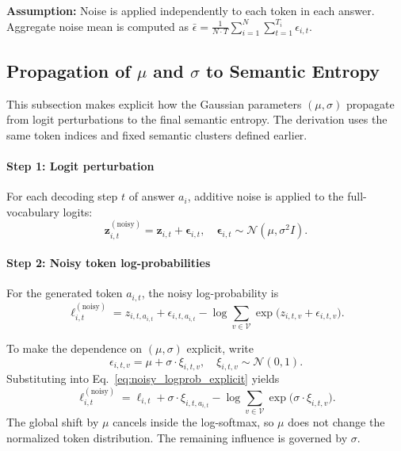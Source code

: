 \documentclass{article}
\begin{document}
\textbf{Assumption:} Noise is applied independently to each token in each answer. Aggregate noise mean is computed as $\bar{\epsilon} = \frac{1}{N \cdot T} \sum_{i=1}^{N} \sum_{t=1}^{T_i} \epsilon_{i,t}$.

\subsection{Propagation of $\mu$ and $\sigma$ to Semantic Entropy}

This subsection makes explicit how the Gaussian parameters $(\mu, \sigma)$ propagate from logit perturbations to the final semantic entropy. The derivation uses the same token indices and fixed semantic clusters defined earlier.

\paragraph{Step 1: Logit perturbation}
For each decoding step $t$ of answer $a_i$, additive noise is applied to the full-vocabulary logits:
\begin{equation}
\boldsymbol{z}_{i,t}^{(\text{noisy})} = \boldsymbol{z}_{i,t} + \boldsymbol{\epsilon}_{i,t},
\quad \boldsymbol{\epsilon}_{i,t} \sim \mathcal{N}(\mu, \sigma^2 I).
\label{eq:noisy_logits}
\end{equation}

\paragraph{Step 2: Noisy token log-probabilities}
For the generated token $a_{i,t}$, the noisy log-probability is
\begin{equation}
\ell_{i,t}^{(\text{noisy})} = z_{i,t,a_{i,t}} + \epsilon_{i,t,a_{i,t}} - \log \sum_{v \in \mathcal{V}} \exp\big(z_{i,t,v} + \epsilon_{i,t,v}\big).
\label{eq:noisy_logprob_explicit}
\end{equation}

To make the dependence on $(\mu,\sigma)$ explicit, write
\begin{equation}
\epsilon_{i,t,v} = \mu + \sigma \cdot \xi_{i,t,v}, \quad \xi_{i,t,v} \sim \mathcal{N}(0,1).
\label{eq:noise_reparam}
\end{equation}
Substituting into Eq.~\eqref{eq:noisy_logprob_explicit} yields
\begin{equation}
\ell_{i,t}^{(\text{noisy})} = \ell_{i,t} + \sigma \cdot \xi_{i,t,a_{i,t}} - \log \sum_{v \in \mathcal{V}} \exp\big(\sigma \cdot \xi_{i,t,v}\big).
\label{eq:noisy_logprob_reparam}
\end{equation}
The global shift by $\mu$ cancels inside the log-softmax, so $\mu$ does not change the normalized token distribution. The remaining influence is governed by $\sigma$.
\end{document}
